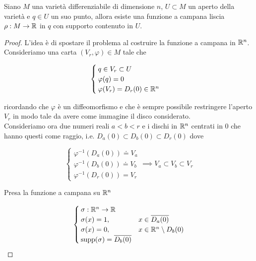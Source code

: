 \begin{theorem}\label{thm:bump-fun}
	Siano $ M $ una varietà differenziabile di dimensione $ n $, $ U \subset M $ un aperto della varietà e $ q \in U $ un suo punto, allora esiste una funzione a campana liscia $ \rho : M \to \mathbb{R} $ in $ q $ con supporto contenuto in $ U $.
\end{theorem}

\begin{proof}
	L'idea è di spostare il problema al costruire la funzione a campana in $ \mathbb{R}^{n} $. \\
	Consideriamo una carta $ (V_{r},\varphi) \in M $ tale che
	
	\begin{equation}
		\begin{cases}
			q \in V_{r} \subset U \\
			\varphi(q) = 0 \\
			\varphi(V_{r}) = D_{r}(0) \in \mathbb{R}^{n}
		\end{cases}
	\end{equation}

	ricordando che $ \varphi $ è un diffeomorfismo e che è sempre possibile restringere l'aperto $ V_{r} $ in modo tale da avere come immagine il disco considerato. \\
	Consideriamo ora due numeri reali $ a < b < r $ e i dischi in $ \mathbb{R}^{n} $ centrati in 0 che hanno questi come raggio, i.e. $ D_{a}(0) \subset D_{b}(0) \subset D_{r}(0) $ dove
	
	\begin{equation}
		\begin{cases}
			\varphi^{-1}(D_{a}(0)) \doteq V_{a} \\
			\varphi^{-1}(D_{b}(0)) \doteq V_{b} \\
			\varphi^{-1}(D_{r}(0)) = V_{r}
		\end{cases} %
		\implies %
		V_{a} \subset V_{b} \subset V_{r}
	\end{equation}
	
	
	Presa la funzione a campana su $ \mathbb{R}^{n} $
	
	\begin{equation}
		\begin{cases}
			\sigma : \mathbb{R}^{n} \to \mathbb{R} \\
			\sigma(x) = 1, & x \in \overline{D_{a}(0)} \\
			\sigma(x) = 0, & x \in \mathbb{R}^{n} \setminus D_{b}(0) \\
			\operatorname{supp}(\sigma) = \overline{D_{b}(0)}
		\end{cases}
	\end{equation}


\end{proof}
